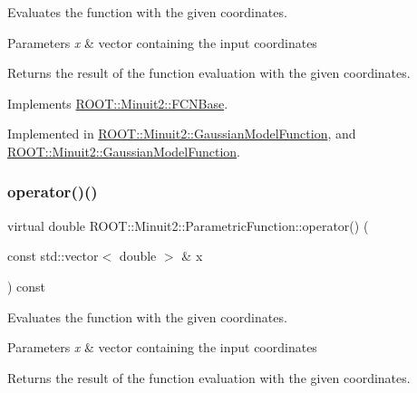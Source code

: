 Evaluates the function with the given coordinates.


\begin{DoxyParams}{Parameters}
{\em x} & vector containing the input coordinates\\
\hline
\end{DoxyParams}
\begin{DoxyReturn}{Returns}
the result of the function evaluation with the given coordinates. 
\end{DoxyReturn}


Implements \mbox{\hyperlink{classROOT_1_1Minuit2_1_1FCNBase_ae4a86bd94d0d0f5ca6fc8f8ab2bb43cd}{R\+O\+O\+T\+::\+Minuit2\+::\+F\+C\+N\+Base}}.



Implemented in \mbox{\hyperlink{classROOT_1_1Minuit2_1_1GaussianModelFunction_af4102c5eecd496d63c5592f7519248ce}{R\+O\+O\+T\+::\+Minuit2\+::\+Gaussian\+Model\+Function}}, and \mbox{\hyperlink{classROOT_1_1Minuit2_1_1GaussianModelFunction_af4102c5eecd496d63c5592f7519248ce}{R\+O\+O\+T\+::\+Minuit2\+::\+Gaussian\+Model\+Function}}.

\mbox{\label{classROOT_1_1Minuit2_1_1ParametricFunction_a953426fa51c84cdef3eba24274131806}} 
\subsubsection{\texorpdfstring{operator()()}{operator()()}\hspace{0.1cm}{\footnotesize\ttfamily [2/6]}}
{\footnotesize\ttfamily virtual double R\+O\+O\+T\+::\+Minuit2\+::\+Parametric\+Function\+::operator() (\begin{DoxyParamCaption}\item[{const std\+::vector$<$ double $>$ \&}]{x }\end{DoxyParamCaption}) const\hspace{0.3cm}{\ttfamily [pure virtual]}}

Evaluates the function with the given coordinates.


\begin{DoxyParams}{Parameters}
{\em x} & vector containing the input coordinates\\
\hline
\end{DoxyParams}
\begin{DoxyReturn}{Returns}
the result of the function evaluation with the given coordinates. 
\end{DoxyReturn}


